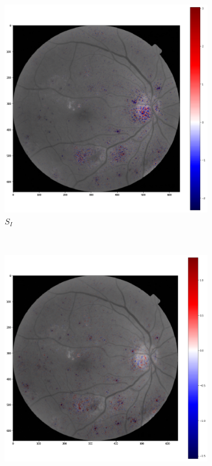 \begin{figure}[!ht]
	\centering
	\begin{subfigure}{0.45\textwidth}
		\includegraphics[width=\textwidth]{Figures/chapter_interpretation/figures/maps/inp.png}
		\caption{$S_I$}
		\label{score:fig:score_input}
	\end{subfigure}
	~ %
	\begin{subfigure}{0.45\textwidth}
		\includegraphics[width=\textwidth]{Figures/chapter_interpretation/figures/maps/kmap.png}

\end{subfigure}
\end{figure}
